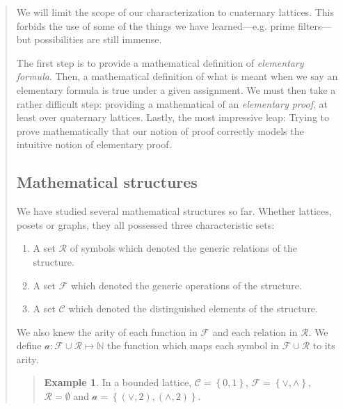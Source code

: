 \documentclass[a4paper, 12pt]{article}
\theoremstyle{definition}
\theoremstyle{definition}
\newtheorem{example}{Example}
\theoremstyle{definition}
\begin{document}
\begin{quote}
We will limit the scope of our characterization to cuaternary lattices. This
forbids the use of some of the things we have learned---e.g. prime
filters---but possibilities are still immense. 

The first step is to provide a mathematical definition of \textit{elementary
formula}. Then, a mathematical definition of what is meant when we say an
elementary formula is true under a given assignment. We must then take a rather
difficult step: providing a mathematical of an \textit{elementary proof}, at
least over quaternary lattices. Lastly, the most impressive leap: Trying to
prove mathematically that our notion of proof correctly models the intuitive
notion of elementary proof.

\subsection{Mathematical structures}

We have studied several mathematical structures so far. Whether lattices, posets or graphs, they all 
possessed three characteristic sets: 

\begin{enumerate}
    \item A set $\mathcal{R}$ of symbols which denoted the generic relations of the structure. 
    \item A set $\mathcal{F}$ which denoted the generic operations of the structure.
    \item A set $\mathcal{C}$ which denoted the distinguished elements of the structure.
\end{enumerate}

We also knew the arity of each function in $\mathcal{F}$ and each relation in
$\mathcal{R}$. We define $\mathcal{a} : \mathcal{F} \cup \mathcal{R} \mapsto
\mathbb{N}$ the function which maps each symbol in $\mathcal{F} \cup
\mathcal{R}$ to its arity.


\small
\begin{quote}

\begin{example}
    In a bounded lattice, $\mathcal{C} = \left\{ 0, 1 \right\} $, $\mathcal{F} = \left\{ \lor , \land  \right\} $, $\mathcal{R} = \emptyset$ and $\mathcal{a} = \left\{ (\lor , 2), (\land, 2) \right\} $.
\end{example}


\end{quote}
\end{quote}
\end{document}
